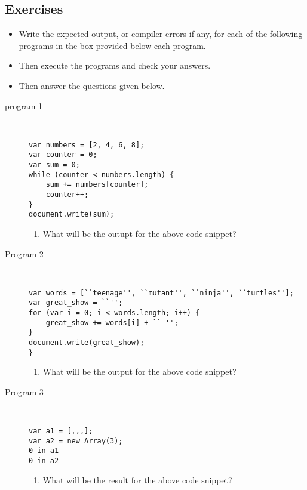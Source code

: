 \documentclass[11pt,a4paper]{article}
\def\AnswerBox{\fbox{\begin{minipage}{4in}\hfill\vspace{0.5in}\end{minipage}}}
\begin{document}
\subsection*{Exercises}
\begin{itemize}
\item Write the expected output, or compiler errors if any, for each of the following programs in the box provided below each program.
\item Then execute the programs and check your answers.
\item Then answer the questions given below.
\end{itemize}
\begin{description}
\item[program 1]\
\begin{lstlisting}
var numbers = [2, 4, 6, 8];
var counter = 0;
var sum = 0;
while (counter < numbers.length) {
    sum += numbers[counter];
    counter++;
}
document.write(sum);
\end{lstlisting}

\AnswerBox

\begin{enumerate}[label=\bfseries Q\arabic*:]\itemsep10pt
\item What will be the outupt for the above code snippet?
\end{enumerate}

\item[Program 2]\
\begin{lstlisting}
var words = [``teenage'', ``mutant'', ``ninja'', ``turtles''];
var great_show = ``'';
for (var i = 0; i < words.length; i++) {
    great_show += words[i] + `` '';
}
document.write(great_show);
}\end{lstlisting}

\AnswerBox

\begin{enumerate}[label=\bfseries Q\arabic*:]\itemsep10pt
\item What will be the output for the above code snippet?
\end{enumerate}
\item [Program 3]\ 
\begin{lstlisting}
var a1 = [,,,]; 
var a2 = new Array(3); 
0 in a1 
0 in a2
\end{lstlisting}
\AnswerBox

\begin{enumerate}[label=\bfseries Q\arabic*:]\itemsep10pt
\item What will be the result for the above code snippet?
\end{enumerate}


\end{description}
\end{document}
